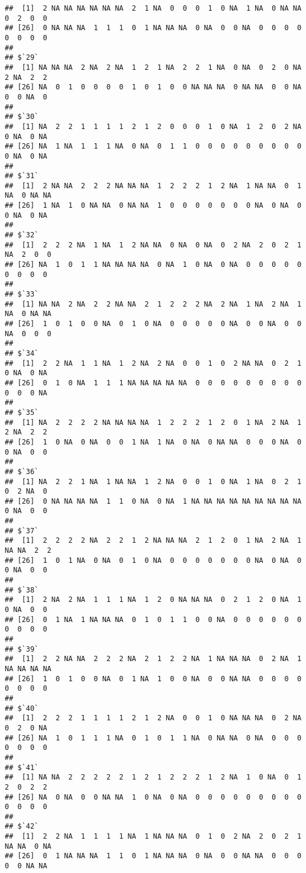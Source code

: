 \documentclass[
]{article}
\begin{document}
\begin{verbatim}
##  [1]  2 NA NA NA NA NA NA  2  1 NA  0  0  0  1  0 NA  1 NA  0 NA NA  0  2  0  0
## [26]  0 NA NA NA  1  1  1  0  1 NA NA NA  0 NA  0  0 NA  0  0  0  0  0  0  0  0
## 
## $`29`
##  [1] NA NA NA  2 NA  2 NA  1  2  1 NA  2  2  1 NA  0 NA  0  2  0 NA  2 NA  2  2
## [26] NA  0  1  0  0  0  0  1  0  1  0  0 NA NA NA  0 NA NA  0  0 NA  0  0 NA  0
## 
## $`30`
##  [1] NA  2  2  1  1  1  1  2  1  2  0  0  0  1  0 NA  1  2  0  2 NA  0 NA  0 NA
## [26] NA  1 NA  1  1  1 NA  0 NA  0  1  1  0  0  0  0  0  0  0  0  0  0 NA  0 NA
## 
## $`31`
##  [1]  2 NA NA  2  2  2 NA NA NA  1  2  2  2  1  2 NA  1 NA NA  0  1 NA  0 NA NA
## [26]  1 NA  1  0 NA NA  0 NA NA  1  0  0  0  0  0  0  0 NA  0 NA  0  0 NA  0 NA
## 
## $`32`
##  [1]  2  2  2 NA  1 NA  1  2 NA NA  0 NA  0 NA  0  2 NA  2  0  2  1 NA  2  0  0
## [26] NA  1  0  1  1 NA NA NA NA  0 NA  1  0 NA  0 NA  0  0  0  0  0  0  0  0  0
## 
## $`33`
##  [1] NA NA  2 NA  2  2 NA NA  2  1  2  2  2 NA  2 NA  1 NA  2 NA  1 NA  0 NA NA
## [26]  1  0  1  0  0 NA  0  1  0 NA  0  0  0  0  0 NA  0  0 NA  0  0 NA  0  0  0
## 
## $`34`
##  [1]  2  2 NA  1  1 NA  1  2 NA  2 NA  0  0  1  0  2 NA NA  0  2  1  0 NA  0 NA
## [26]  0  1  0 NA  1  1  1 NA NA NA NA NA  0  0  0  0  0  0  0  0  0  0  0  0 NA
## 
## $`35`
##  [1] NA  2  2  2  2 NA NA NA NA  1  2  2  2  1  2  0  1 NA  2 NA  1  2 NA  2  2
## [26]  1  0 NA  0 NA  0  0  1 NA  1 NA  0 NA  0 NA NA  0  0  0 NA  0  0 NA  0  0
## 
## $`36`
##  [1] NA  2  2  1 NA  1 NA NA  1  2 NA  0  0  1  0 NA  1 NA  0  2  1  0  2 NA  0
## [26]  0 NA NA NA NA  1  1  0 NA  0 NA  1 NA NA NA NA NA NA NA NA NA  0 NA  0  0
## 
## $`37`
##  [1]  2  2  2  2 NA  2  2  1  2 NA NA NA  2  1  2  0  1 NA  2 NA  1 NA NA  2  2
## [26]  1  0  1 NA  0 NA  0  1  0 NA  0  0  0  0  0  0  0 NA  0 NA  0  0 NA  0  0
## 
## $`38`
##  [1]  2 NA  2 NA  1  1  1 NA  1  2  0 NA NA NA  0  2  1  2  0 NA  1  0 NA  0  0
## [26]  0  1 NA  1 NA NA NA  0  1  0  1  1  0  0 NA  0  0  0  0  0  0  0  0  0  0
## 
## $`39`
##  [1]  2  2 NA NA  2  2  2 NA  2  1  2  2 NA  1 NA NA NA  0  2 NA  1 NA NA NA NA
## [26]  1  0  1  0  0 NA  0  1 NA  1  0  0 NA  0  0 NA NA  0  0  0  0  0  0  0  0
## 
## $`40`
##  [1]  2  2  2  1  1  1  1  2  1  2 NA  0  0  1  0 NA NA NA  0  2 NA  0  2  0 NA
## [26] NA  1  0  1  1  1 NA  0  1  0  1  1 NA  0 NA NA  0 NA  0  0  0  0  0  0  0
## 
## $`41`
##  [1] NA NA  2  2  2  2  2  1  2  1  2  2  2  1  2 NA  1  0 NA  0  1  2  0  2  2
## [26] NA  0 NA  0  0 NA NA  1  0 NA  0 NA  0  0  0  0  0  0  0  0  0  0  0  0  0
## 
## $`42`
##  [1]  2  2 NA  1  1  1  1 NA  1 NA NA NA  0  1  0  2 NA  2  0  2  1 NA NA  0 NA
## [26]  0  1 NA NA NA  1  1  0  1 NA NA NA  0 NA  0  0 NA NA  0  0  0  0  0 NA NA

\end{verbatim}
\end{document}
